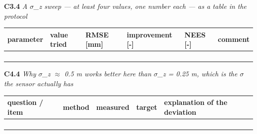 \documentclass[a4paper,10pt]{article}
\begin{document}
\vspace{4pt}\noindent\textbf{C3.4} \emph{A \(\sigma\)\_z sweep --- at least four values, one number each --- as a table in the protocol}

\begin{tabular}{|>{\raggedright\hyphenpenalty 500\arraybackslash}p{2.90cm}|>{\raggedright\hyphenpenalty 500\arraybackslash}p{1.81cm}|>{\raggedright\hyphenpenalty 500\arraybackslash}p{1.52cm}|>{\raggedright\hyphenpenalty 500\arraybackslash}p{3.40cm}|>{\raggedright\hyphenpenalty 500\arraybackslash}p{1.52cm}|>{\raggedright\hyphenpenalty 500\arraybackslash}p{2.37cm}|}
\hline
\textbf{parameter} & \textbf{value tried} & \textbf{RMSE [mm]} & \textbf{improvement [-]} & \textbf{NEES [-]} & \textbf{comment} \\
\hline
\rule{0pt}{2.4em} & \rule{0pt}{2.4em} & \rule{0pt}{2.4em} & \rule{0pt}{2.4em} & \rule{0pt}{2.4em} & \rule{0pt}{2.4em} \\
\rule{0pt}{2.4em} & \rule{0pt}{2.4em} & \rule{0pt}{2.4em} & \rule{0pt}{2.4em} & \rule{0pt}{2.4em} & \rule{0pt}{2.4em} \\
\rule{0pt}{2.4em} & \rule{0pt}{2.4em} & \rule{0pt}{2.4em} & \rule{0pt}{2.4em} & \rule{0pt}{2.4em} & \rule{0pt}{2.4em} \\
\rule{0pt}{2.4em} & \rule{0pt}{2.4em} & \rule{0pt}{2.4em} & \rule{0pt}{2.4em} & \rule{0pt}{2.4em} & \rule{0pt}{2.4em} \\
\hline
\end{tabular}

\vspace{4pt}\noindent\textbf{C4.4} \emph{Why \(\sigma\)\_z \(\approx\) 0.5 m works better here than \(\sigma\)\_z = 0.25 m, which is the \(\sigma\) the sensor actually has}

\begin{tabular}{|>{\raggedright\hyphenpenalty 500\arraybackslash}p{2.87cm}|>{\raggedright\hyphenpenalty 500\arraybackslash}p{2.28cm}|>{\raggedright\hyphenpenalty 500\arraybackslash}p{2.87cm}|>{\raggedright\hyphenpenalty 500\arraybackslash}p{2.28cm}|>{\raggedright\hyphenpenalty 500\arraybackslash}p{3.70cm}|}
\hline
\textbf{question / item} & \textbf{method} & \textbf{measured} & \textbf{target} & \textbf{explanation of the deviation} \\
\hline
\rule{0pt}{2.4em} & \rule{0pt}{2.4em} & \rule{0pt}{2.4em} & \rule{0pt}{2.4em} & \rule{0pt}{2.4em} \\
\rule{0pt}{2.4em} & \rule{0pt}{2.4em} & \rule{0pt}{2.4em} & \rule{0pt}{2.4em} & \rule{0pt}{2.4em} \\
\rule{0pt}{2.4em} & \rule{0pt}{2.4em} & \rule{0pt}{2.4em} & \rule{0pt}{2.4em} & \rule{0pt}{2.4em} \\
\rule{0pt}{2.4em} & \rule{0pt}{2.4em} & \rule{0pt}{2.4em} & \rule{0pt}{2.4em} & \rule{0pt}{2.4em} \\
\hline
\end{tabular}
\end{document}
